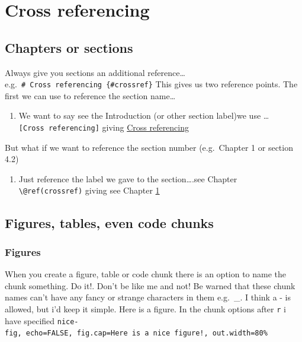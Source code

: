 \documentclass[
  12pt,
  oneside]{book}
\providecommand{\tightlist}{%
  \setlength{\itemsep}{0pt}\setlength{\parskip}{0pt}}
\begin{document}
\hypertarget{crossref}{%
\chapter{Cross referencing}\label{crossref}}

\hypertarget{chapters-or-sections}{%
\section{Chapters or sections}\label{chapters-or-sections}}

Always give you sections an additional reference\ldots e.g.~\texttt{\#\ Cross\ referencing\ \{\#crossref\}} This gives us two reference points. The first we can use to reference the section name\ldots{}

\begin{enumerate}
\def\labelenumi{\arabic{enumi}.}
\tightlist
\item
  We want to say see the Introduction (or other section label)we use \ldots{}\texttt{{[}Cross\ referencing{]}} giving \protect\hyperlink{crossref}{Cross referencing}
\end{enumerate}

But what if we want to reference the section number (e.g.~Chapter 1 or section 4.2)

\begin{enumerate}
\def\labelenumi{\arabic{enumi}.}
\tightlist
\item
  Just reference the label we gave to the section\ldots.see Chapter \texttt{\textbackslash{}@ref(crossref)} giving see Chapter \ref{crossref}
\end{enumerate}

\hypertarget{figures-tables-even-code-chunks}{%
\section{Figures, tables, even code chunks}\label{figures-tables-even-code-chunks}}

\hypertarget{figures}{%
\subsection{Figures}\label{figures}}

When you create a figure, table or code chunk there is an option to name the chunk something. Do it!. Don't be like me and not! Be warned that these chunk names can't have any fancy or strange characters in them e.g.~\_. I think a - is allowed, but i'd keep it simple. Here is a figure. In the chunk options after \texttt{r} i have specified \texttt{nice-fig,\ echo=FALSE,\ fig.cap=\textquotesingle{}Here\ is\ a\ nice\ figure!\textquotesingle{},\ out.width=\textquotesingle{}80\%\textquotesingle{}}
\end{document}
